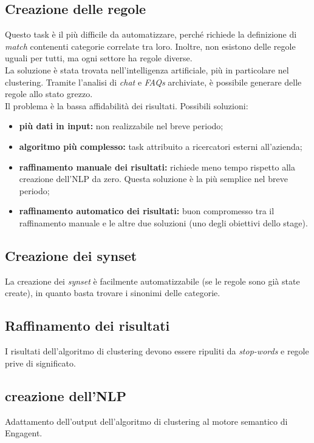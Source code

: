\subsection{Creazione delle regole}\label{creazione_regole}
Questo task è il più difficile da automatizzare, perché richiede la definizione di \emph{match} contenenti categorie correlate tra loro. Inoltre, non esistono delle regole uguali per tutti, ma ogni settore ha regole diverse.\\
La soluzione è stata trovata nell'intelligenza artificiale, più in particolare nel clustering. Tramite l'analisi di \emph{chat} e \textit{FAQs} archiviate, è possibile generare delle regole allo stato grezzo.\\
Il problema è la bassa affidabilità dei risultati. Possibili soluzioni:
\begin{itemize}
    \item \textbf{più dati in input:} non realizzabile nel breve periodo;
    \item \textbf{algoritmo più complesso:} task attribuito a ricercatori esterni all'azienda;
    \item \textbf{raffinamento manuale dei risultati:} richiede meno tempo rispetto alla creazione dell'NLP da zero. Questa soluzione è la più semplice nel breve periodo; 
    \item \textbf{raffinamento automatico dei risultati:} buon compromesso tra il raffinamento manuale e le altre due soluzioni (uno degli obiettivi dello stage).
\end{itemize}

\subsection{Creazione dei synset}
La creazione dei \emph{synset} è facilmente automatizzabile (se le regole sono già state create), in quanto basta trovare i sinonimi delle categorie.

\subsection{Raffinamento dei risultati}
I risultati dell'algoritmo di clustering devono essere ripuliti da \emph{stop-words} e regole prive di significato.

\subsection{creazione dell'NLP}
Adattamento dell'output dell'algoritmo di clustering al motore semantico di Engagent.

